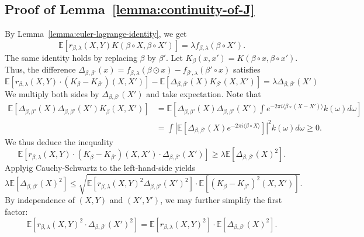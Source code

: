 \documentclass[sn-mathphys-num]{sn-jnl}%
\numberwithin{equation}{section}
\newcommand{\E}{\mathbb{E}}
\newcommand{\kernel}{K}
\theoremstyle{thmstyleone}%
\theoremstyle{thmstyletwo}%
\theoremstyle{thmstylethree}%
\begin{document}
\subsection{Proof of Lemma~\ref{lemma:continuity-of-J}}
\label{sec:proof-of-lemma-continuity-of-J}
By Lemma~\ref{lemma:euler-lagrange-identity}, we get 
\begin{equation*}
	\E[r_{\beta, \lambda}(X, Y) \kernel(\beta \circ X, \beta \circ X')] = \lambda f_{\beta, \lambda}(\beta \circ X').
\end{equation*}
The same identity holds by replacing $\beta$ by $\beta'$. Let 
$\kernel_\beta(x, x') = \kernel(\beta \circ x, \beta \circ x')$. Thus, the difference 
$\Delta_{\beta, \beta'}(x) = f_{\beta, \lambda}(\beta \odot x) - f_{\beta', \lambda}(\beta' \circ x)$ satisfies 
\begin{equation*}
	\E[r_{\beta, \lambda}(X, Y) \cdot (\kernel_\beta - \kernel_{\beta'})(X,X')] -\E[\Delta_{\beta, \beta'}(X) \kernel_{\beta'}(X, X')] = \lambda \Delta_{\beta, \beta'}(X')
\end{equation*} 
We multiply both sides by $\Delta_{\beta, \beta'}(X')$ and take expectation. Note that 
\begin{equation*}
\begin{split}
	\E[\Delta_{\beta, \beta'}(X) \Delta_{\beta, \beta'}(X') \kernel_\beta(X, X')] &
		= \E[\Delta_{\beta, \beta'}(X)\Delta_{\beta, \beta'}(X') \int e^{-2\pi i\langle \beta \circ (X- X')\rangle}
		k(\omega) d\omega] \\
		&= \int \left|\E[\Delta_{\beta, \beta'}(X) e^{-2\pi i \langle \beta \circ X\rangle}]\right|^2 k(\omega) d\omega \ge 0.
\end{split} 
\end{equation*}
We thus deduce the inequality
\begin{equation*}
	\E[r_{\beta, \lambda}(X, Y) \cdot (\kernel_\beta - \kernel_{\beta'})(X,X') \cdot \Delta_{\beta, \beta'}(X')] \ge \lambda \E[\Delta_{\beta, \beta'}(X)^2].
\end{equation*}
Applyig Cauchy-Schwartz to the left-hand-side yields
\begin{equation*}
	\lambda \E[\Delta_{\beta, \beta'}(X)^2] \le \sqrt{\E[r_{\beta, \lambda}(X, Y)^2 \Delta_{\beta, \beta'}(X')^2] \cdot \E[(\kernel_\beta - \kernel_{\beta'})^2(X,X')]}.
\end{equation*}
By independence of $(X, Y)$ and $(X', Y')$, we may further simplify the first factor:
\begin{equation*}
\E[r_{\beta, \lambda}(X, Y)^2 \cdot \Delta_{\beta, \beta'}(X')^2]
= \E[r_{\beta, \lambda}(X, Y)^2] \cdot \E[\Delta_{\beta, \beta'}(X)^2].
\end{equation*}
\end{document}
